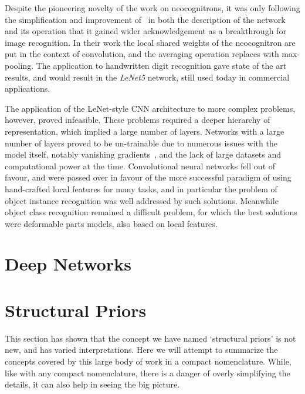 \documentclass[thesis]{subfiles}
\begin{document}
	Despite the pioneering novelty of the work on neocognitrons, it was only following the simplification and improvement of~\citet{lecun1989backpropagation,Lecun1998} in both the description of the network and its operation that it gained wider acknowledgement as a breakthrough for image recognition. In their work the local shared weights of the neocognitron are put in the context of convolution, and the averaging operation replaces with max-pooling. The application to handwritten digit recognition gave state of the art results, and would result in the \emph{LeNet5} network, still used today in commercial applications.
	
	The application of the LeNet-style CNN architecture to more complex problems, however, proved infeasible. These problems required a deeper hierarchy of representation, which implied a large number of layers. Networks with a large number of layers proved to be un-trainable due to numerous issues with the model itself, notably vanishing gradients~\citep{hochreiter1991untersuchungen}, and the lack of large datasets and computational power at the time. Convolutional neural networks fell out of favour, and were passed over in favour of the more successful paradigm of using hand-crafted local features for many tasks, and in particular the problem of object instance recognition was well addressed by such solutions. Meanwhile object class recognition remained a difficult problem, for which the best solutions were deformable parts models, also based on local features.
	
\section{Deep Networks}
	\citep{Krizhevsky2012}
	\citep{Simonyan2014verydeep}
	\citep{He2015}
	\citep{He2016}


\section{Structural Priors}
    This section has shown that the concept we have named `structural priors' is not new, and has varied interpretations. Here we will attempt to summarize the concepts covered by this large body of work in a compact nomenclature. While, like with any compact nomenclature, there is a danger of overly simplifying the details, it can also help in seeing the big picture.
    
\end{document}
